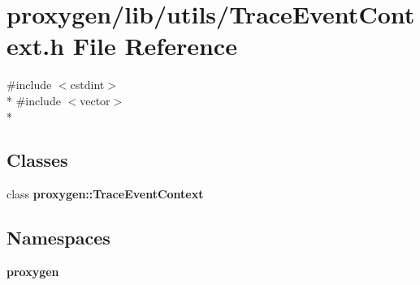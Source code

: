 \section{proxygen/lib/utils/\+Trace\+Event\+Context.h File Reference}
\label{TraceEventContext_8h}
{\ttfamily \#include $<$cstdint$>$}\\*
{\ttfamily \#include $<$vector$>$}\\*
\subsection*{Classes}
\begin{DoxyCompactItemize}
\item 
class {\bf proxygen\+::\+Trace\+Event\+Context}
\end{DoxyCompactItemize}
\subsection*{Namespaces}
\begin{DoxyCompactItemize}
\item 
 {\bf proxygen}
\end{DoxyCompactItemize}
